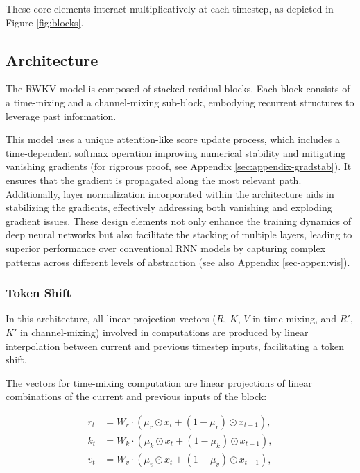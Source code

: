 These core elements interact multiplicatively at each timestep, as depicted in Figure \ref{fig:blocks}.

\subsection{Architecture}

The RWKV model is composed of stacked residual blocks. Each block consists of a time-mixing and a channel-mixing sub-block, embodying recurrent structures to leverage past information.

This model uses a unique attention-like score update process, which includes a time-dependent softmax operation improving numerical stability and mitigating vanishing gradients (for rigorous proof, see Appendix \ref{sec:appendix-gradstab}). It ensures that the gradient is propagated along the most relevant path. Additionally, layer normalization \cite{ba2016layer} incorporated within the architecture aids in stabilizing the gradients, effectively addressing both vanishing and exploding gradient issues. These design elements not only enhance the training dynamics of deep neural networks but also facilitate the stacking of multiple layers, leading to superior performance over conventional RNN models by capturing complex patterns across different levels of abstraction (see also Appendix \ref{sec-appen:vis}).

\subsubsection{Token Shift} \label {tokenshift}

In this architecture, all linear projection vectors ($R$, $K$, $V$ in time-mixing, and $R'$, $K'$ in channel-mixing) involved in computations are produced by linear interpolation between current and previous timestep inputs, facilitating a token shift.

The vectors for time-mixing computation are linear projections of linear combinations of the current and previous inputs of the block:

\begin{align}
\label{eq:time-mix1}
r_t &= W_r \cdot (\mu_r \odot x_t + (1 - \mu_r) \odot x_{t-1} ), \\
\label{eq:time-mix2}
k_t &= W_k \cdot (\mu_k \odot x_t + (1 - \mu_k) \odot x_{t-1} ), \\
\label{eq:time-mix3}
v_t &= W_v \cdot (\mu_v \odot x_t + (1 - \mu_v) \odot x_{t-1} ),
\end{align}

